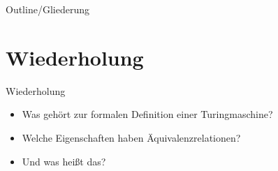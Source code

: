 
\subtitle{Foliensatz 13}
\date{31. Januar 2013}

\newcommand{\sq}{$\square$}
\newcommand{\da}{$\downarrow$}
\DeclareMathOperator{\cod}{cod}



\begin{frame}
    \titlepage
\end{frame}

\begin{frame}{Outline/Gliederung}
    \tableofcontents
\end{frame}

\section{Wiederholung}
\begin{frame}{Wiederholung}
    \begin{itemize}
        \item Was gehört zur formalen Definition einer Turingmaschine?\\
        \item Welche Eigenschaften haben Äquivalenzrelationen?
        \item Und was heißt das?
    \end{itemize}
\end{frame}
